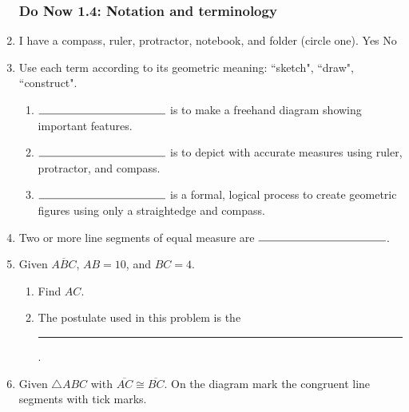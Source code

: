 \documentclass[12pt, oneside]{article}
\begin{document}
\begin{enumerate}
\newpage
\subsubsection*{Do Now 1.4: Notation and terminology} %
    \item I have a compass, ruler, protractor, notebook, and folder (circle one). Yes \qquad No

    \item Use each term according to its geometric meaning: ``sketch", ``draw", ``construct".
    \begin{enumerate}
      \item $\rule{4cm}{0.15mm}$ is to make a freehand diagram showing important features. \smallskip
      \item $\rule{4cm}{0.15mm}$ is to depict with accurate measures using ruler, protractor, and compass. \smallskip
      \item $\rule{4cm}{0.15mm}$ is a formal, logical process to create geometric figures using only a straightedge and compass.
    \end{enumerate} \smallskip

  \item Two or more line segments of equal measure are $\rule{4cm}{0.15mm}$.
    \bigskip
  \item Given $\overline{ABC}$, $AB=10$, and $BC=4$.
  \begin{enumerate}
    \item Find ${AC}$.\\[0.75cm]
       \smallskip
    \item The postulate used in this problem is the \rule{6cm}{0.15mm}.
  \end{enumerate}
  \smallskip

  \item Given $\triangle ABC$ with $\overline{AC} \cong \overline{BC}$. On the diagram mark the congruent line segments with tick marks.
  \begin{center}
  \end{center}


\end{enumerate}
\end{document}

